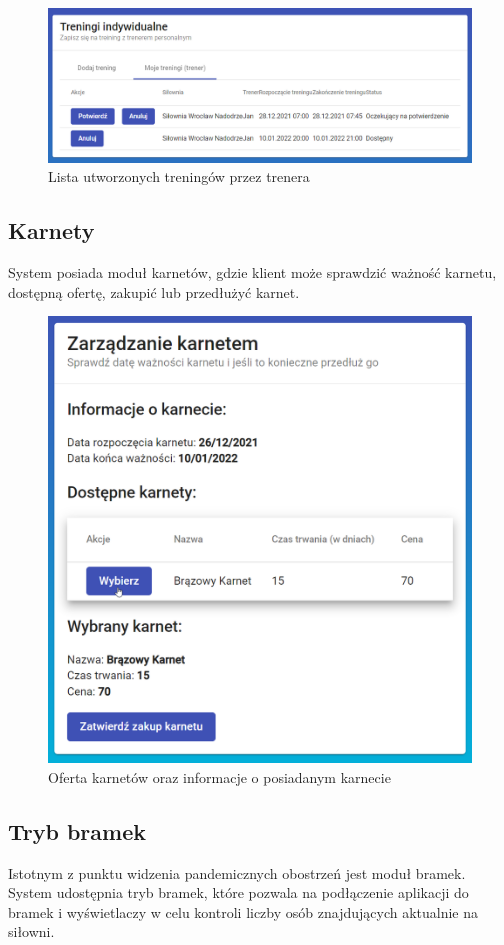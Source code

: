\documentclass[a4paper,twoside,12pt]{book}
\begin{document}
{\begin{figure}[h!]
	\centering
	\includegraphics[width=0.9\linewidth]{../zrzuty_ekranu/dzialanie/treningi/trener_lista_treningow}
	\caption{Lista utworzonych treningów przez trenera}
	\label{fig:trenerlistatreningow}
\end{figure}
\FloatBarrier

\subsection{Karnety}
System posiada moduł karnetów, gdzie klient może sprawdzić ważność karnetu, dostępną ofertę, zakupić lub przedłużyć karnet.
\begin{figure}[h!]
	\centering
	\includegraphics[width=0.5\linewidth]{../zrzuty_ekranu/dzialanie/karnety/lista_karnetow}
	\caption{Oferta karnetów oraz informacje o posiadanym karnecie}
	\label{fig:listakarnetow}
\end{figure}
\FloatBarrier

\subsection{Tryb bramek}
Istotnym z punktu widzenia pandemicznych obostrzeń jest moduł bramek. System udostępnia tryb bramek, które pozwala na podłączenie aplikacji do bramek i wyświetlaczy w celu kontroli liczby osób znajdujących aktualnie na siłowni.
}
\end{document}
